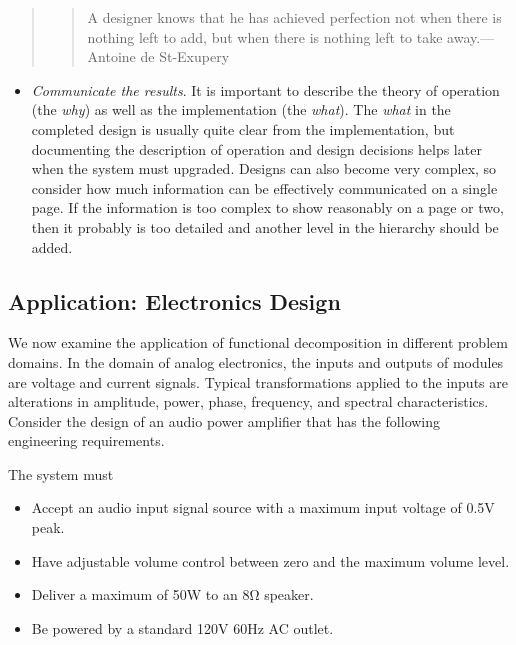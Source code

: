 \begin{quote}
\begin{quote}
A designer knows that he has achieved perfection not when there is
nothing left to add, but when there is nothing left to take
away.---Antoine de St-Exupery
\end{quote}
\end{quote}

\begin{itemize}
\item
  \emph{Communicate the results}. It is important to describe the theory
  of operation (the \emph{why}) as well as the implementation (the
  \emph{what}). The \emph{what} in the completed design is usually quite
  clear from the implementation, but documenting the description of
  operation and design decisions helps later when the system must
  upgraded. Designs can also become very complex, so consider how much
  information can be effectively communicated on a single page. If the
  information is too complex to show reasonably on a page or two, then
  it probably is too detailed and another level in the hierarchy should
  be added.
\end{itemize}

\subsection{Application: Electronics
Design}\label{application-electronics-design}

We now examine the application of functional decomposition in different
problem domains. In the domain of analog electronics, the inputs and
outputs of modules are voltage and current signals. Typical
transformations applied to the inputs are alterations in amplitude,
power, phase, frequency, and spectral characteristics. Consider the
design of an audio power amplifier that has the following engineering
requirements.

The system must

\begin{itemize}
\item
  Accept an audio input signal source with a maximum input voltage of
  0.5V peak.
\item
  Have adjustable volume control between zero and the maximum volume
  level.
\item
  Deliver a maximum of 50W to an 8Ω speaker.
\item
  Be powered by a standard 120V 60Hz AC outlet.
\end{itemize}

